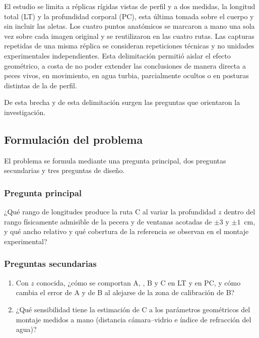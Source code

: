 El estudio se limita a réplicas rígidas vistas de perfil y a dos medidas, la longitud total (LT) y la profundidad corporal (PC), esta última tomada sobre el cuerpo y sin incluir las aletas. Los cuatro puntos anatómicos se marcaron a mano una sola vez sobre cada imagen original y se reutilizaron en las cuatro rutas. Las capturas repetidas de una misma réplica se consideran repeticiones técnicas y no unidades experimentales independientes. Esta delimitación permitió aislar el efecto geométrico, a costa de no poder extender las conclusiones de manera directa a peces vivos, en movimiento, en agua turbia, parcialmente ocultos o en posturas distintas de la de perfil.

De esta brecha y de esta delimitación surgen las preguntas que orientaron la investigación.

\subsection{Formulación del problema}
\label{sec:formulacion}

El problema se formula mediante una pregunta principal, dos preguntas secundarias y tres preguntas de diseño.

\subsubsection*{Pregunta principal}

¿Qué rango de longitudes produce la ruta C al variar la profundidad $z$ dentro del rango físicamente admisible de la pecera y de ventanas acotadas de $\pm 3$ y $\pm 1$~cm, y qué ancho relativo y qué cobertura de la referencia se observan en el montaje experimental?

\subsubsection*{Preguntas secundarias}

\begin{enumerate}
  \item Con $z$ conocida, ¿cómo se comportan A, \Aprime, B y C en LT y en PC, y cómo cambia el error de A y de B al alejarse de la zona de calibración de B?
  \item ¿Qué sensibilidad tiene la estimación de C a los parámetros geométricos del montaje medidos a mano (distancia cámara--vidrio e índice de refracción del agua)?
\end{enumerate}

